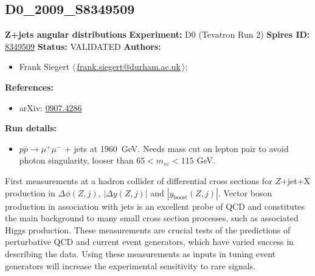 \subsection[D0\_2009\_S8349509]{D0\_2009\_S8349509\,\cite{Abazov:2009pp}}
\textbf{Z+jets angular distributions}\newline
\textbf{Experiment:} D0 (Tevatron Run 2) \newline
\textbf{Spires ID:} \href{http://www.slac.stanford.edu/spires/find/hep/www?rawcmd=key+8349509}{8349509}\newline
\textbf{Status:} VALIDATED\newline
\textbf{Authors:}
\begin{itemize}
  \item Frank Siegert $\langle\,$\href{mailto:frank.siegert@durham.ac.uk}{frank.siegert@durham.ac.uk}$\,\rangle$;
\end{itemize}
\textbf{References:}
\begin{itemize}
  \item arXiv: \href{http://arxiv.org/abs/0907.4286}{0907.4286}
\end{itemize}
\textbf{Run details:}
\begin{itemize}

  \item $p \bar{p} \to \mu^+ \mu^-$ + jets at 1960~GeV. Needs mass cut on lepton pair to avoid photon singularity, looser than $65 < m_{ee} < 115$ GeV.\end{itemize}

\noindent First measurements at a hadron collider of differential cross sections for $Z$+jet+X production in $\Delta\phi(Z, j)$, $|\Delta y(Z, j)|$ and $|y_\mathrm{boost}(Z, j)|$. Vector boson production in association with jets is an excellent probe of QCD and constitutes the main background to many small cross section processes, such as associated Higgs production. These measurements are crucial tests of the predictions of perturbative QCD and current event generators, which have varied success in describing the data. Using these measurements as inputs in tuning event generators will increase the experimental sensitivity to rare signals.

\clearpage


\clearpage

